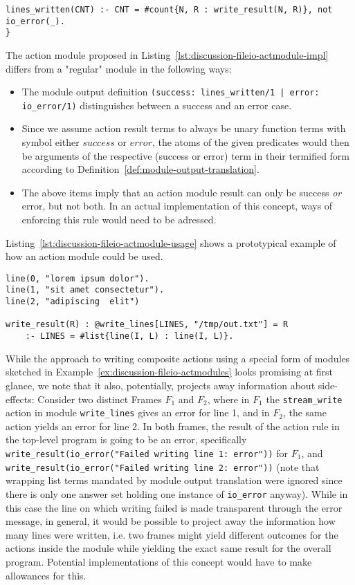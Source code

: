 \begin{example}
\begin{lstlisting}[style=asp-code, label={lst:discussion-fileio-actmodule-impl}, caption={Prototypical definition of a module containing Evolog actions.}]
	lines_written(CNT) :- CNT = #count{N, R : write_result(N, R)}, not io_error(_).		
}	
\end{lstlisting}	
The action module proposed in Listing~\ref{lst:discussion-fileio-actmodule-impl} differs from a "regular" module in the following ways:
\begin{itemize}
	\item The module output definition \texttt{(success: lines\_written/1 | error: io\_error/1)} distinguishes between a success and an error case. 
	\item Since we assume action result terms to always be unary function terms with symbol either $\mathit{success}$ or $\mathit{error}$, the atoms of the given predicates would then be arguments of the respective (success or error) term in their termified form according to Definition~\ref{def:module-output-translation}.
	\item The above items imply that an action module result can only be success \emph{or} error, but not both. In an actual implementation of this concept, ways of enforcing this rule would need to be adressed. 
\end{itemize}
Listing~\ref{lst:discussion-fileio-actmodule-usage} shows a prototypical example of how an action module could be used.
\begin{lstlisting}
line(0, "lorem ipsum dolor").
line(1, "sit amet consectetur").
line(2, "adipiscing  elit")

write_result(R) : @write_lines[LINES, "/tmp/out.txt"] = R 
	:- LINES = #list{line(I, L) : line(I, L)}.
\end{lstlisting}		
\end{example}

While the approach to writing composite actions using a special form of modules sketched in Example~\ref{ex:discussion-fileio-actmodules} looks promising at first glance, we note that it also, potentially, projects away information about side-effects: Consider two distinct Frames $F_1$ and $F_2$, where in $F_1$ the \texttt{stream\_write} action in module \texttt{write\_lines} gives an error for line 1, and in $F_2$, the same action yields an error for line 2. In both frames, the result of the action rule in the top-level program is going to be an error, specifically \texttt{write\_result(io\_error("Failed writing line 1: error"))} for $F_1$, and \texttt{write\_result(io\_error("Failed writing line 2: error"))} (note that wrapping list terms mandated by module output translation were ignored since there is only one answer set holding one instance of \texttt{io\_error} anyway). While in this case the line on which writing failed is made transparent through the error message, in general, it would be possible to project away the information how many lines were written, i.e. two frames might yield different outcomes for the actions inside the module while yielding the exact same result for the overall program. Potential implementations of this concept would have to make allowances for this.


